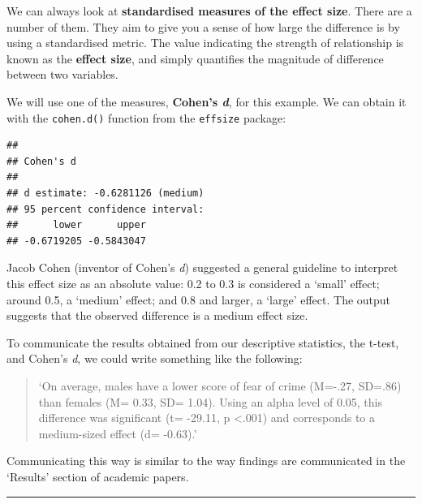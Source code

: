 \documentclass[
]{book}
\newenvironment{Shaded}{\begin{snugshade}}{\end{snugshade}}
\newcommand{\FunctionTok}[1]{\textcolor[rgb]{0.00,0.00,0.00}{#1}}
\newcommand{\NormalTok}[1]{#1}
\newcommand{\SpecialCharTok}[1]{\textcolor[rgb]{0.00,0.00,0.00}{#1}}
\begin{document}
We can always look at \textbf{standardised measures of the effect size}. There are a number of them. They aim to give you a sense of how large the difference is by using a standardised metric. The value indicating the strength of relationship is known as the \textbf{effect size}, and simply quantifies the magnitude of difference between two variables.

We will use one of the measures, \textbf{Cohen's \emph{d}}, for this example. We can obtain it with the \texttt{cohen.d()} function from the \texttt{effsize} package:

\begin{Shaded}
\end{Shaded}

\begin{verbatim}
## 
## Cohen's d
## 
## d estimate: -0.6281126 (medium)
## 95 percent confidence interval:
##      lower      upper 
## -0.6719205 -0.5843047
\end{verbatim}

Jacob Cohen (inventor of Cohen's \emph{d}) suggested a general guideline to interpret this effect size as an absolute value: 0.2 to 0.3 is considered a `small' effect; around 0.5, a `medium' effect; and 0.8 and larger, a `large' effect. The output suggests that the observed difference is a medium effect size.

To communicate the results obtained from our descriptive statistics, the t-test, and Cohen's \emph{d}, we could write something like the following:

\begin{quote}
`On average, males have a lower score of fear of crime (M=-.27, SD=.86) than females (M= 0.33, SD= 1.04). Using an alpha level of 0.05, this difference was significant (t= -29.11, p \textless.001) and corresponds to a medium-sized effect (d= -0.63).'
\end{quote}

Communicating this way is similar to the way findings are communicated in the `Results' section of academic papers.

\begin{center}\rule{0.5\linewidth}{0.5pt}\end{center}
\end{document}
